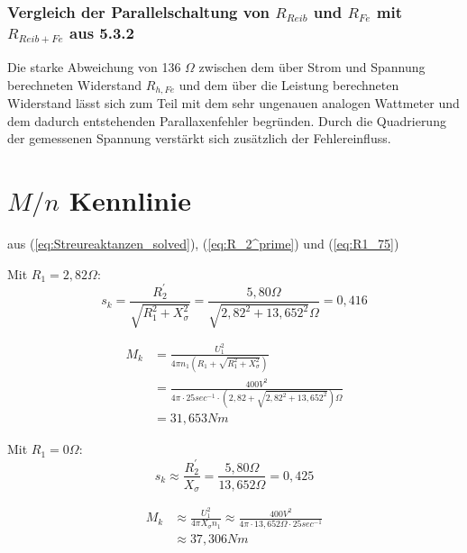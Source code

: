 \documentclass[conference]{IEEEtran}
\begin{document}
\subsubsection{Vergleich der Parallelschaltung von $R_{Reib}$ und $R_{Fe}$ mit
$R_{Reib+Fe}$ aus 5.3.2}

Die starke Abweichung von 136 $ \Omega$ zwischen dem über Strom und Spannung
berechneten Widerstand $R_{h, Fe}$ und dem über die Leistung berechneten
Widerstand lässt sich zum Teil mit dem sehr ungenauen analogen Wattmeter und
dem dadurch entstehenden Parallaxenfehler begründen. Durch die Quadrierung der
gemessenen Spannung verstärkt sich zusätzlich der Fehlereinfluss.

\section{$M/n$ Kennlinie}

aus (\ref{eq:Streureaktanzen_solved}), (\ref{eq:R_2^prime}) und (\ref{eq:R1_75})

\smallskip
Mit $R_1 = 2,82\Omega$:
\begin{equation} \label{eq:s_k-mit-R_1}
    s_k = \frac{R_2^{\prime}}{\sqrt{R_{1}^{2} + X_{\sigma}^{2}}} = \frac{5,80\Omega}{\sqrt{2,82^2+13,652^2}\Omega} = 0,416
\end{equation}

\begin{align}
    M_{k} & = \frac{U_{1}^{2}}{4 \pi n_{1} \left(R_{1} + \sqrt{R_{1}^{2} + X_{\sigma}^{2}}\right)}           \\
          & = \frac{400\si{V}^{2}}{4 \pi \cdot 25 \si{sec^{-1}} \cdot (2,82 + \sqrt{2,82^2+13,652^2})\Omega} \\
          & = 31,653 \si{Nm}
    \label{eq:M_k-mit-R_1}
\end{align}

\smallskip
Mit $R_1 = 0\Omega$:
\begin{equation} \label{eq:s_k-naehrung}
    s_k \approx \frac{R_2^{\prime}}{X_{\sigma}} = \frac{5,80\Omega}{13,652\Omega} = 0,425
\end{equation}

\begin{align}
    M_{k} & \approx \frac{U_{1}^{2}}{4 \pi X_{\sigma} n_{1}} \approx \frac{400\si{V}^{2}}{4 \pi\cdot 13,652 \Omega \cdot 25 \si{sec^{-1}}} \\
          & \approx 37,306 \si{Nm}
    \label{eq:M_k-mit-R_1}
\end{align}



\end{document}
